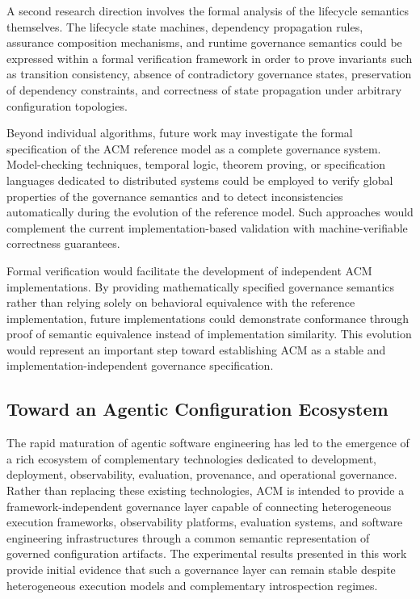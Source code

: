 \documentclass[10pt]{article}
\begin{document}
A second research direction involves the formal analysis of the lifecycle semantics themselves. The lifecycle state machines, dependency propagation rules, assurance composition mechanisms, and runtime governance semantics could be expressed within a formal verification framework in order to prove invariants such as transition consistency, absence of contradictory governance states, preservation of dependency constraints, and correctness of state propagation under arbitrary configuration topologies.

Beyond individual algorithms, future work may investigate the formal specification of the ACM reference model as a complete governance system. Model-checking techniques, temporal logic, theorem proving, or specification languages dedicated to distributed systems could be employed to verify global properties of the governance semantics and to detect inconsistencies automatically during the evolution of the reference model. Such approaches would complement the current implementation-based validation with machine-verifiable correctness guarantees.

Formal verification would facilitate the development of independent ACM implementations. By providing mathematically specified governance semantics rather than relying solely on behavioral equivalence with the reference implementation, future implementations could demonstrate conformance through proof of semantic equivalence instead of implementation similarity. This evolution would represent an important step toward establishing ACM as a stable and implementation-independent governance specification.

\subsection{Toward an Agentic Configuration Ecosystem}
\label{sec:future_ecosystem}

The rapid maturation of agentic software engineering has led to the emergence of a rich ecosystem of complementary technologies dedicated to development, deployment, observability, evaluation, provenance, and operational governance. Rather than replacing these existing technologies, ACM is intended to provide a framework-independent governance layer capable of connecting heterogeneous execution frameworks, observability platforms, evaluation systems, and software engineering infrastructures through a common semantic representation of governed configuration artifacts. The experimental results presented in this work provide initial evidence that such a governance layer can remain stable despite heterogeneous execution models and complementary introspection regimes.
\end{document}
